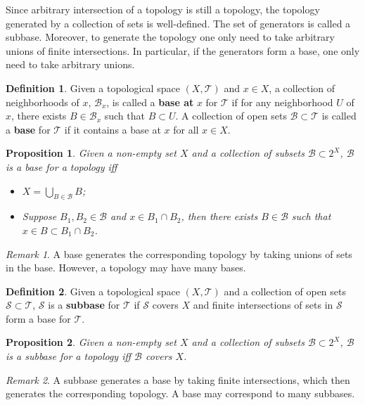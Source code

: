 \documentclass[openany]{book}
\newtheorem{proposition}{Proposition}[chapter]
\theoremstyle{definition}
\newtheorem{definition}{Definition}[chapter]
\theoremstyle{remark}
\newtheorem*{remark}{Remark}
\begin{document}
Since arbitrary intersection of a topology is still a topology, the topology generated by a collection of sets is well-defined. The set of generators is called a subbase. Moreover, to generate the topology one only need to take arbitrary unions of finite intersections. In particular, if the generators form a base, one only need to take arbitrary unions.
\begin{definition}
    Given a topological space $(X,\mathcal{T})$ and $x\in X$, a collection of neighborhoods of $x$, $\mathcal{B}_x$, is called a \textbf{base at} $x$ for $\mathcal{T}$ if for any neighborhood $U$ of $x$, there exists $B\in \mathcal{B}_x$ such that $B\subset U$. A collection of open sets $\mathcal{B}\subset \mathcal{T}$ is called a \textbf{base} for $\mathcal{T}$ if it contains a base at $x$ for all $x\in X$.
\end{definition}
\begin{proposition}
    Given a non-empty set $X$ and a collection of subsets $\mathcal{B}\subset2^X$, $\mathcal{B}$ is a base for a topology iff
    \begin{itemize}
        \item $X=\bigcup_{B\in \mathcal{B}}B$;
        \item Suppose $B_1,B_2\in \mathcal{B}$ and $x\in B_1\cap B_2$, then there exists $B\in \mathcal{B}$ such that $x\in B\subset B_1\cap B_2$.
    \end{itemize}
\end{proposition}
\begin{remark}
    A base generates the corresponding topology by taking unions of sets in the base. However, a topology may have many bases.
\end{remark}
\begin{definition}
    Given a topological space $(X,\mathcal{T})$ and a collection of open sets $\mathcal{S}\subset \mathcal{T}$, $\mathcal{S}$ is a \textbf{subbase} for $\mathcal{T}$ if $\mathcal{S}$ covers $X$ and finite intersections of sets in $\mathcal{S}$ form a base for $\mathcal{T}$.
\end{definition}
\begin{proposition}
    Given a non-empty set $X$ and a collection of subsets $\mathcal{B}\subset2^X$, $\mathcal{B}$ is a subbase for a topology iff $\mathcal{B}$ covers $X$.
\end{proposition}
\begin{remark}
    A subbase generates a base by taking finite intersections, which then generates the corresponding topology. A base may correspond to many subbases.
\end{remark}
\end{document}
